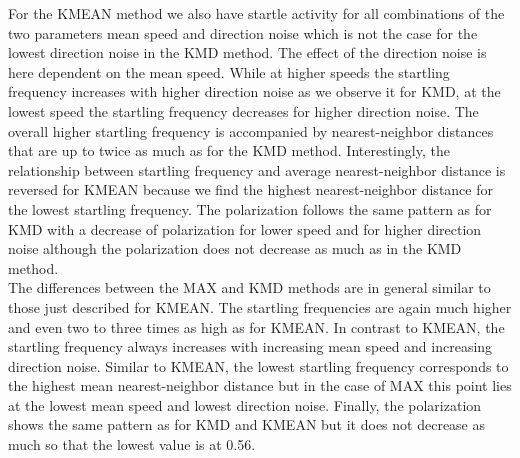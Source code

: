     For the KMEAN method we also have startle activity for all combinations of the two parameters mean speed and direction noise which is not the case for the lowest direction noise in the KMD method.
    The effect of the direction noise is here dependent on the mean speed.
    While at higher speeds the startling frequency increases with higher direction noise as we observe it for KMD, at the lowest speed the startling frequency decreases for higher direction noise.
    The overall higher startling frequency is accompanied by nearest-neighbor distances that are up to twice as much as for the KMD method.
    Interestingly, the relationship between startling frequency and average nearest-neighbor distance is reversed for KMEAN because we find the highest nearest-neighbor distance for the lowest startling frequency.
    The polarization follows the same pattern as for KMD with a decrease of polarization for lower speed and for higher direction noise although the polarization does not decrease as much as in the KMD method.\\
    The differences between the MAX and KMD methods are in general similar to those just described for KMEAN.
    The startling frequencies are again much higher and even two to three times as high as for KMEAN.
    In contrast to KMEAN, the startling frequency always increases with increasing mean speed and increasing direction noise.
    Similar to KMEAN, the lowest startling frequency corresponds to the highest mean nearest-neighbor distance but in the case of MAX this point lies at the lowest mean speed and lowest direction noise.
    Finally, the polarization shows the same pattern as for KMD and KMEAN but it does not decrease as much so that the lowest value is at 0.56.    
